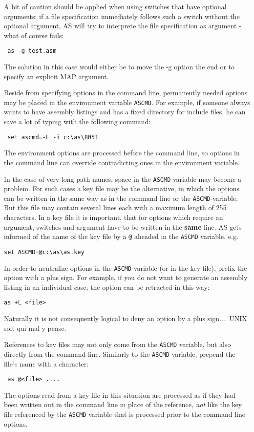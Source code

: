 \documentclass[12pt,twoside]{report}
\newcommand{\bb}[1]{{\bf #1}}
\newcommand{\tty}[1]{{\tt #1}}
\newcommand{\asname}{{AS}}
\begin{document}
A bit of caution should be applied when using switches that have
optional arguments: if a file specification immediately follows such
a switch without the optional argument, \asname{} will try to interprete the
file specification as argument - what of course fails:
\begin{verbatim}
 as -g test.asm
\end{verbatim}
The solution in this case would either be to move the -g option the
end or to specify an explicit MAP argument.


Beside from specifying options in the command line, permanently
needed options may be placed in the environment variable \tty{ASCMD}.  For
example, if someone always wants to have assembly listings and has a
fixed directory for include files, he can save a lot of typing with
the following command:
\begin{verbatim}
 set ascmd=-L -i c:\as\8051
\end{verbatim}
The environment options are processed before the command line,
so options in the command line can override contradicting ones in the
environment variable.

In the case of very long path names, space in the \tty{ASCMD} variable may
become a problem.  For such cases a key file may be the alternative,
in which the options can be written in the same way as in the command
line or the \tty{ASCMD}-variable.  But this file may contain several lines
each with a maximum length of 255 characters.  In a key file it is
important, that for options which require an argument, switches and
argument have to be written in the \bb{same} line.  \asname{} gets informed of
the name of the key file by a \tty{@} aheaded in the \tty{ASCMD} variable,
e.g.
\begin{verbatim}
set ASCMD=@c:\as\as.key
\end{verbatim}
In order to neutralize options in the \tty{ASCMD} variable (or in the
key file), prefix the option with a plus sign.  For example, if you
do not want to generate an assembly listing in an individual case,
the option can be retracted in this way:
\begin{verbatim}
as +L <file>
\end{verbatim}
Naturally it is not consequently logical to deny an option by a
plus sign....  UNIX soit qui mal y pense.

References to key files may not only come from the {\tt ASCMD} variable,
but also directly from the command line.  Similarly to the {\tt ASCMD}
variable, prepend the file's name with a \@ character:
\begin{verbatim}
 as @<file> ....
\end{verbatim}
The options read from a key file in this situation are processed as if
they had been written out in the command line in place of the reference,
{\em not} like the key file referenced by the {\tt ASCMD} variable that is
processed prior to the command line options.
\end{document}
